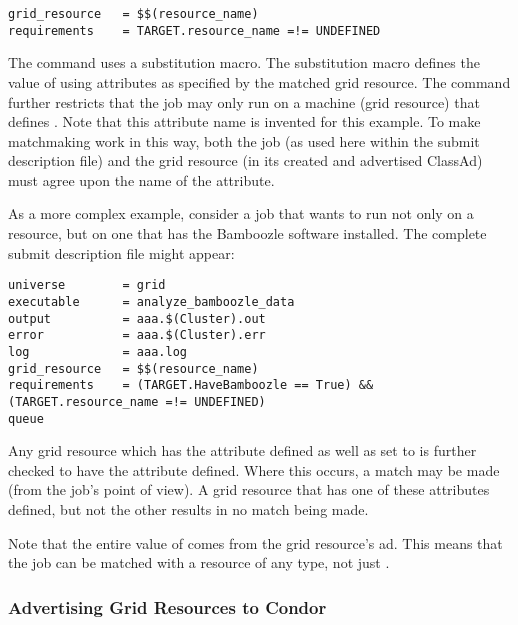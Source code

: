 \footnotesize
\begin{verbatim}
grid_resource   = $$(resource_name)
requirements    = TARGET.resource_name =!= UNDEFINED
\end{verbatim}
\normalsize

The  command uses a substitution
macro.
The substitution macro defines the value 
of  using attributes
as specified by the matched grid resource.
The  command further restricts that
the job may only run on a machine (grid resource) that
defines .
Note that this attribute name is invented for this example.
To make matchmaking work in this way,
both the job (as used here within the submit description file)
and the grid resource (in its created and advertised ClassAd)
must agree upon the name of the attribute.

As a more complex example,
consider a job that wants
to run not only
on a  resource,
but on one that has the Bamboozle software installed.
The complete submit description file might appear:

\footnotesize
\begin{verbatim}
universe        = grid
executable      = analyze_bamboozle_data
output          = aaa.$(Cluster).out
error           = aaa.$(Cluster).err
log             = aaa.log
grid_resource   = $$(resource_name)
requirements    = (TARGET.HaveBamboozle == True) && (TARGET.resource_name =!= UNDEFINED)
queue
\end{verbatim}
\normalsize

Any grid resource which has the
 attribute defined as well as
set to  is further checked to have the
 attribute defined.
Where this occurs, a match may be made (from the
job's point of view).
A grid resource that has one of these attributes defined,
but not the other results in no match being made.

Note that the entire value of  comes from
the grid resource's ad. This means that the job can be matched with
a resource of any type, not just .

\subsubsection{Advertising Grid Resources to Condor}

